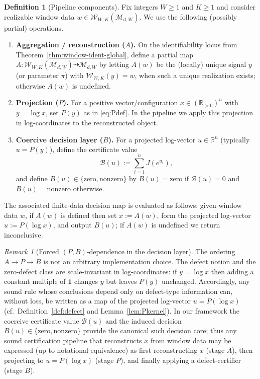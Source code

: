 \documentclass[11pt,reqno]{amsart}
\theoremstyle{definition}
\newtheorem{definition}[theorem]{Definition}
\theoremstyle{remark}
\newtheorem{remark}[theorem]{Remark} %
\newcommand{\R}{\mathbb{R}}
\newcommand{\Rp}{\mathbb{R}_{>0}}
\newcommand{\1}{\mathbf{1}}
\newcommand{\zero}{\mathrm{zero}}
\newcommand{\nonzero}{\mathrm{nonzero}}
\newcommand{\inconclusive}{\mathrm{inconclusive}}
\begin{document}
\begin{definition}[Pipeline components]\label{def:pipeline-components}
Fix integers $W\ge 1$ and $K\ge 1$ and consider realizable window data $w\in\mathcal{W}_{W,K}(\mathcal{M}_{d,W})$.
We use the following (possibly partial) operations.
\begin{enumerate}[label=\textup{(\alph*)},leftmargin=2.2em]
\item \textbf{Aggregation / reconstruction ($A$).} On the identifiability locus from Theorem~\ref{thm:window-ident-global}, define
a partial map $A:\mathcal{W}_{W,K}(\mathcal{M}_{d,W})\dashrightarrow \mathcal{M}_{d,W}$ by letting $A(w)$ be the (locally) unique
signal $y$ (or parameter $\pi$) with $\mathcal{W}_{W,K}(y)=w$, when such a unique realization exists; otherwise $A(w)$ is undefined.
\item \textbf{Projection ($P$).} For a positive vector/configuration $x\in(\Rp)^n$ with $y=\log x$, set $P(y)$ as in
\eqref{eq:Pdef}. In the pipeline we apply this projection in log-coordinates to the reconstructed object.
\item \textbf{Coercive decision layer ($B$).} For a projected log-vector $u\in\R^n$ (typically $u=P(y)$), define the
certificate value
\[
\mathcal{B}(u):=\sum_{i=1}^n J\!\left(e^{u_i}\right),
\]
and define $B(u)\in\{\zero,\nonzero\}$ by $B(u)=\zero$ if $\mathcal{B}(u)=0$ and $B(u)=\nonzero$ otherwise.
\end{enumerate}
The associated finite-data decision map is evaluated as follows: given window data $w$, if $A(w)$ is defined then set $x:=A(w)$, form the projected log-vector $u:=P(\log x)$, and output $B(u)$; if $A(w)$ is undefined we return $\inconclusive$.

\begin{remark}[Forced $(P,B)$-dependence in the decision layer]\label{rem:forced-PB}
The ordering $A\to P\to B$ is not an arbitrary implementation choice. The defect notion and the zero-defect class are scale-invariant in log-coordinates: if $y=\log x$ then adding a constant multiple of $\mathbf 1$ changes $y$ but leaves $P(y)$ unchanged. Accordingly, any sound rule whose conclusions depend only on defect-type information can, without loss, be written as a map of the projected log-vector $u=P(\log x)$ (cf.\ Definition~\ref{def:defect} and Lemma~\ref{lem:Pkernel}). In our framework the coercive certificate value $\mathcal B(u)$ and the induced decision $B(u)\in\{\zero,\nonzero\}$ provide the canonical such decision core; thus any sound certification pipeline that reconstructs $x$ from window data may be expressed (up to notational equivalence) as first reconstructing $x$ (stage $A$), then projecting to $u=P(\log x)$ (stage $P$), and finally applying a defect-certifier (stage $B$).
\end{remark}


\end{definition}
\end{document}
